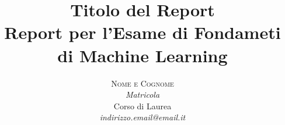 \documentclass[10pt,a4paper]{article}
\begin{document}
\title{Titolo del Report \\
\Large{Report per l'Esame di Fondameti di Machine Learning}
} %

\author{\textsc{Nome e Cognome} \\
    \emph{Matricola} \\
    Corso di Laurea\\
    \emph{indirizzo.email@email.it}
  }

\date{}

\maketitle %

\begin{abstract}
\normalsize
\lipsum[9]

\end{abstract}




{}

\end{document}
